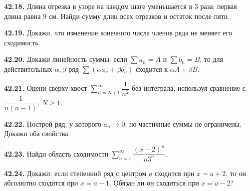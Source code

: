 \noindent\begin{minipage}[t]{\linewidth}\textbf{42.18.} Длина отрезка в узоре на каждом шаге уменьшается в 3 раза; первая длина равна 9 см. Найди сумму длин всех отрезков и остаток после пяти.\par\end{minipage}\par
\noindent\begin{minipage}[t]{\linewidth}\textbf{42.19.} Докажи, что изменение конечного числа членов ряда не меняет его сходимость.\par\end{minipage}\par
\noindent\begin{minipage}[t]{\linewidth}\textbf{42.20.} Докажи линейность суммы: если \(\sum a_n=A\) и \(\sum b_n=B\), то для действительных \(\alpha,\beta\) ряд \(\sum(\alpha a_n+\beta b_n)\) сходится к \(\alpha A+\beta B\).\par\end{minipage}\par
\noindent\begin{minipage}[t]{\linewidth}\textbf{42.21.}\starmark{} Оцени сверху хвост \(\sum_{n=N+1}^\infty\dfrac1{n^2}\) без интеграла, используя сравнение с \(\dfrac1{n(n-1)}\), \(N\ge1\).\par\end{minipage}\par
\noindent\begin{minipage}[t]{\linewidth}\textbf{42.22.}\starmark{} Построй ряд, у которого \(a_n\to0\), но частичные суммы не ограничены. Докажи оба свойства.\par\end{minipage}\par
\noindent\begin{minipage}[t]{\linewidth}\textbf{42.23.}\starmark{} Найди область сходимости \(\sum_{n=1}^\infty\dfrac{(x-2)^n}{n3^n}\).\par\end{minipage}\par
\noindent\begin{minipage}[t]{\linewidth}\textbf{42.24.}\starmark{} Докажи: если степенной ряд с центром \(a\) сходится при \(x=a+2\), то он абсолютно сходится при \(x=a-1\). Обязан ли он сходиться при \(x=a-2\)?\par\end{minipage}\par
\endgroup
